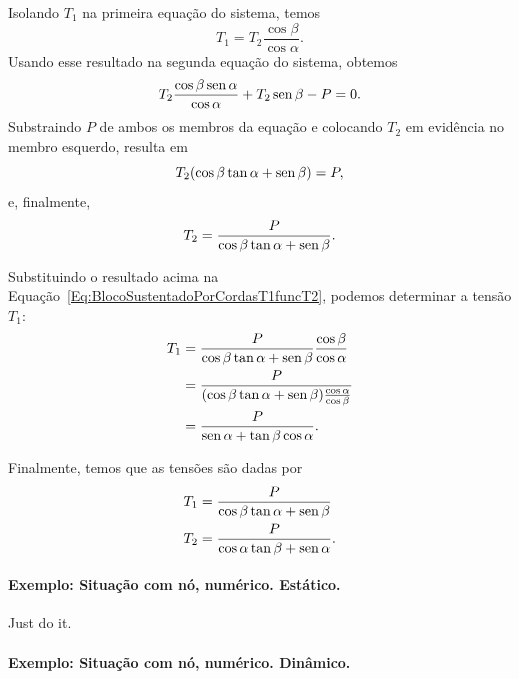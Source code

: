 \noindent{}Isolando $T_1$ na primeira equação do sistema, temos
\begin{equation}\label{Eq:BlocoSustentadoPorCordasT1funcT2}
    T_1 = T_2 \frac{\cos\beta}{\cos\alpha}.
\end{equation}
%
Usando esse resultado na segunda equação do sistema, obtemos
\begin{equation}
    T_2 \frac{\cos\beta\operatorname{sen}\alpha}{\cos\alpha} + T_2\operatorname{sen}\beta - P = 0.
\end{equation}
%
Substraindo $P$ de ambos os membros da equação e colocando $T_2$ em evidência no membro esquerdo, resulta em
\begin{equation}
    T_2 (\cos\beta\tan\alpha + \operatorname{sen}\beta) = P,
\end{equation}
%
e, finalmente,
\begin{equation}
    T_2 = \frac{P}{\cos\beta\tan\alpha + \operatorname{sen}\beta}.
\end{equation}

Substituindo o resultado acima na Equação~\eqref{Eq:BlocoSustentadoPorCordasT1funcT2}, podemos determinar a tensão $T_1$:
\begin{align}
    T_1 &= \frac{P}{\cos\beta\tan\alpha + \operatorname{sen}\beta} \frac{\cos\beta}{\cos\alpha} \\
    &= \frac{P}{(\cos\beta\tan\alpha + \operatorname{sen}\beta)\frac{\cos\alpha}{\cos\beta}} \\
    &=\frac{P}{\operatorname{sen}\alpha + \tan\beta\cos\alpha}.
\end{align}

\noindent{}Finalmente, temos que as tensões são dadas por
\begin{align}
    T_1 &= \frac{P}{\cos\beta\tan\alpha + \operatorname{sen}\beta} \\
    T_2 &= \frac{P}{\cos\alpha\tan\beta + \operatorname{sen}\alpha}.
\end{align}

\paragraph{Exemplo: Situação com nó, numérico. Estático.}

\textrm{Just do it.}

\paragraph{Exemplo: Situação com nó, numérico. Dinâmico.}

